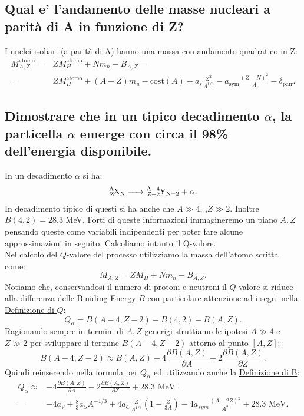 \subsection[]{ Qual e' l'andamento delle masse nucleari a parità di A in funzione di Z?}
I nuclei isobari (a parità di A) hanno una massa con andamento quadratico in Z:
\begin{align*}
	M_{A,Z}^{\text{atomo}} =& ZM_H^{\text{atomo}} + Nm_n - B_{A,Z} =\\
	=&ZM_H^{\text{atomo}}+\left(A-Z\right)m_u-\text{cost}\left(A\right)-a_s\frac{Z^2}{A^{1/3}}-a_{\text{sym}}\frac{\left(Z-N\right)^2}{A}-\delta_{\text{pair}}
.\end{align*}

\subsection[]{ Dimostrare che in un tipico decadimento $\alpha$, la particella $\alpha$ emerge con circa il 98\% dell'energia disponibile.}
In un decadimento $\alpha$ si ha:
\[
\ce{\ce{^{A}_{Z}X_{N}} -> \ce{^{A-4}_{Z-2}Y_{N-2}} + \alpha}
.\] 
In decadimento tipico di questi si ha anche che $A\gg 4$, ,$Z\gg 2$. Inoltre $B\left( 4,2 \right) = 28.3$ MeV. Forti di queste informazioni immagineremo un piano $A,Z$ pensando queste come variabili indipendenti per poter fare alcune approssimazioni in seguito. Calcoliamo intanto il Q-valore.\\
Nel calcolo del $Q$-valore del processo utilizziamo la massa dell'atomo scritta come:
\[
M_{A,Z} = ZM_H + N m_n - B_{A,Z} 
.\] 
Notiamo che, conservandosi il numero di protoni e neutroni il $Q$-valore si riduce alla differenza delle Biniding Energy $B$ con particolare attenzione ad i segni nella \hyperref[eq:Q-valore]{Definizione di $Q$}:
 \[
	 Q_{\alpha} = B\left( A-4,Z-2 \right) + B\left( 4,2 \right) - B\left( A,Z \right) 
.\] 
Ragionando sempre in termini di $A,Z$ generigi sfruttiamo le ipotesi $A\gg 4$ e $Z\gg 2$ per sviluppare il termine $B\left( A-4,Z-2 \right) $ attorno al punto $\left[ A , Z \right]$:
\[
	B\left( A-4,Z-2 \right) \approx B\left( A, Z \right) - 4 \frac{\partial B\left( A,Z \right)}{\partial A}-2\frac{\partial B\left( A,Z \right) }{\partial Z}   
.\] 
Quindi reinserendo nella formula per $Q_{\alpha}$ ed utilizzando anche la \hyperref[eq:B-energy]{Definizione di B}:
\begin{align*}
	Q_{\alpha} \approx& - 4 \frac{\partial B\left( A,Z \right)}{\partial A}-2\frac{\partial B\left( A,Z \right) }{\partial Z} + 28.3 \text{ MeV} =\\
	=& -4a_V + \frac{8}{3} a_S A^{-1 /3} +4 a_C \frac{Z}{A^{1 /3}}\left( 1- \frac{Z}{3A} \right) - 4a_{sym} \frac{\left( A-2Z \right)^2 }{A^2} + 28.3 \text{ MeV} 
.\end{align*}
